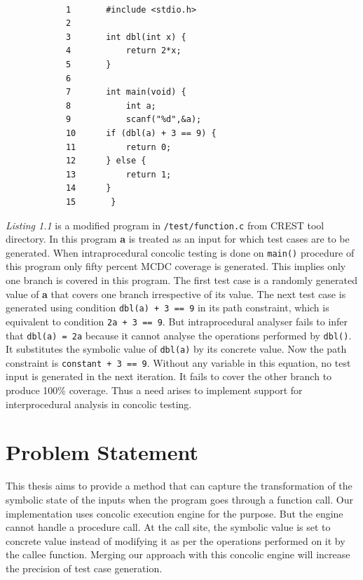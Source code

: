 \documentclass[12pt,oneside]{book}
\begin{document}
\begin{lstlisting}[caption=Motivational example]

			1		#include <stdio.h>
			2
			3		int dbl(int x) {
			4 			return 2*x;
			5		}
			6
			7		int main(void) {
			8 			int a;
			9			scanf("%d",&a);
			10 		if (dbl(a) + 3 == 9) {
			11	   		return 0;
			12 		} else {
			13	   		return 1;
			14 		}
			15		 }

\end{lstlisting}

\textit{Listing 1.1} is a modified program in \texttt{/test/function.c} from CREST\cite{crest} tool directory. In this program \textbf{a} is treated as an input for which test cases are to be generated. When intraprocedural concolic testing is done on \texttt{main()} procedure of this program only fifty percent MCDC\cite{mcdc} coverage is generated. This implies only one branch is covered in this program. The first test case is a randomly generated value of \textbf{a} that covers one branch irrespective of its value. The next test case is generated using condition \texttt{dbl(a) + 3 == 9} in its path constraint, which is equivalent to condition \texttt{2a + 3 == 9}. But intraprocedural analyser fails to infer that \texttt{dbl(a) = 2a} because it cannot analyse the operations performed by \texttt{dbl()}. It substitutes the symbolic value of \texttt{dbl(a)} by its concrete value. Now the path constraint is \texttt{constant + 3 == 9}. Without any variable in this equation, no test input is generated in the next iteration. It fails to cover the other branch to produce 100\% coverage. Thus a need arises to implement support for interprocedural analysis in concolic testing.      


\section{Problem Statement}
This thesis aims to provide a method that can capture the transformation of the symbolic state of the inputs when the program goes through a function call. Our implementation uses concolic execution engine\cite{concolicEngine} for the purpose. But the engine cannot handle a procedure call. At the call site, the symbolic value is set to concrete value instead of modifying it as per the operations performed on it by the callee function. Merging our approach with this concolic engine will increase the precision of test case generation. 
\end{document}
